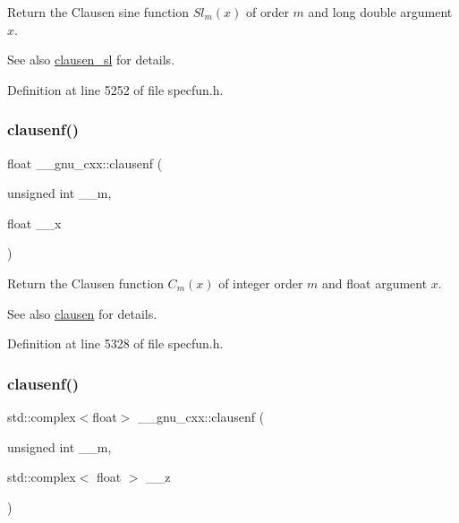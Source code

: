 Return the Clausen sine function $ Sl_m(x) $ of order $ m $ and {\ttfamily long double} argument $ x $.

\begin{DoxySeeAlso}{See also}
\hyperlink{group__gnu__math__spec__func_gacb757b00309213cd96bb2bc6b5dc3c24}{clausen\+\_\+sl} for details. 
\end{DoxySeeAlso}


Definition at line 5252 of file specfun.\+h.

\mbox{\label{group__gnu__math__spec__func_ga6422bdec1a3c930fb1623094cd2eaff2}} 
\subsubsection{\texorpdfstring{clausenf()}{clausenf()}\hspace{0.1cm}{\footnotesize\ttfamily [1/2]}}
{\footnotesize\ttfamily float \+\_\+\+\_\+gnu\+\_\+cxx\+::clausenf (\begin{DoxyParamCaption}\item[{unsigned int}]{\+\_\+\+\_\+m,  }\item[{float}]{\+\_\+\+\_\+x }\end{DoxyParamCaption})\hspace{0.3cm}{\ttfamily [inline]}}

Return the Clausen function $ C_m(x) $ of integer order $ m $ and {\ttfamily float} argument $ x $.

\begin{DoxySeeAlso}{See also}
\hyperlink{group__gnu__math__spec__func_ga54e4ba71b1f81718d6998349f91ff88f}{clausen} for details. 
\end{DoxySeeAlso}


Definition at line 5328 of file specfun.\+h.

\mbox{\label{group__gnu__math__spec__func_ga98b5ba1e5de4ef2e0e9422ac8d9ce2ad}} 
\subsubsection{\texorpdfstring{clausenf()}{clausenf()}\hspace{0.1cm}{\footnotesize\ttfamily [2/2]}}
{\footnotesize\ttfamily std\+::complex$<$float$>$ \+\_\+\+\_\+gnu\+\_\+cxx\+::clausenf (\begin{DoxyParamCaption}\item[{unsigned int}]{\+\_\+\+\_\+m,  }\item[{std\+::complex$<$ float $>$}]{\+\_\+\+\_\+z }\end{DoxyParamCaption})\hspace{0.3cm}{\ttfamily [inline]}}

